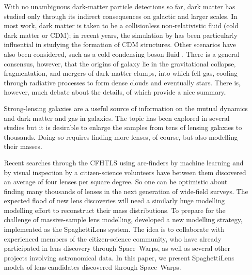 \documentclass[fleqn,usenatbib]{mnras}
\begin{document}
With no unambiguous dark-matter particle detections so far, dark
matter has studied only through its indirect consequences on galactic
and larger scales.  In most work, dark matter is taken to be a
collisionless non-relativistic fluid (cold dark matter or CDM); in
recent years, the simulation by \cite{2005Natur.435..629S} has been
particularly influential in studying the formation of CDM structures.
Other scenarios have also been considered, such as a cold condensing
boson fluid \citep{2016ApJ...818...89S}.  There is a general
consensus, however, that the origins of galaxy lie in the
gravitational collapse, fragmentation, and mergers of dark-matter
clumps, into which fell gas, cooling through radiative processes to
form dense clouds and eventually stars.  There is, however, much
debate about the details, of which \cite{2012RAA....12..917S} provide
a nice summary.

Strong-lensing galaxies are a useful source of information on the
mutual dynamics and dark matter and gas in galaxies.  The topic has
been explored in several studies
\citep{2009ApJ...703L..51K,2011ApJ...740...97L,2012MNRAS.424..104L,
  2016MNRAS.459.3677L,2016MNRAS.456..870B} but it is desirable to
enlarge the samples from tens of lensing galaxies to thousands.  Doing
so requires finding more lenses, of course, but also modelling their
masses.

Recent searches through the CFHTLS \citep{2012SPIE.8448E..0MC} using
arc-finders
\citep{2012ApJ...749...38M,2014A&A...567A.111M,2014ApJ...785..144G} by
machine learning \citep{2016arXiv160504309P} and by visual inspection
by a citizen-science volunteers
\citep[Space~Warps][]{2016MNRAS.455.1191M} have between them
discovered an average of four lenses per square degree.  So one can be
optimistic about finding many thousands of lenses in the next
generation of wide-field surveys.  The expected flood of new lens
discoveries will need a similarly huge modelling modelling effort to
reconstruct their mass distributions.  To prepare for the challenge of
massive-sample lens modelling, \cite{2015MNRAS.447.2170K} developed a
new modelling strategy, implemented as the SpaghettiLens system.  The
idea is to collaborate with experienced members of the citizen-science
community, who have already participated in lens discovery through
Space~Warps, as well as several other projects involving astronomical
data.  In this paper, we present SpaghettiLens models of
lens-candidates discovered through Space~Warps.
\end{document}
